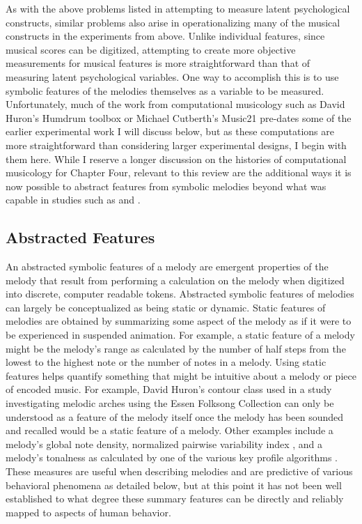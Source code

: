 \documentclass[12pt,]{book}
\begin{document}
As with the above problems listed in attempting to measure latent psychological constructs, similar problems also arise in operationalizing many of the musical constructs in the experiments from above.
Unlike individual features, since musical scores can be digitized, attempting to create more objective measurements for musical features is more straightforward than that of measuring latent psychological variables.
One way to accomplish this is to use symbolic features of the melodies themselves as a variable to be measured.
Unfortunately, much of the work from computational musicology such as David Huron's Humdrum toolbox \citep{huronHumdrumToolkitReference1994} or Michael Cutberth's Music21 \citep{cuthbertMusic21ToolkitComputerAided2010} pre-dates some of the earlier experimental work I will discuss below, but as these computations are more straightforward than considering larger experimental designs, I begin with them here.
While I reserve a longer discussion on the histories of computational musicology for Chapter Four, relevant to this review are the additional ways it is now possible to abstract features from symbolic melodies beyond what was capable in studies such as \citet{ortmannTonalDeterminantsMelodic1933} and \citet{taylorStrategiesMemoryShort1983}.

\hypertarget{abstracted-features}{%
\subsection{Abstracted Features}\label{abstracted-features}}

An abstracted symbolic features of a melody are emergent properties of the melody that result from performing a calculation on the melody when digitized into discrete, computer readable tokens.
Abstracted symbolic features of melodies can largely be conceptualized as being static or dynamic.
Static features of melodies are obtained by summarizing some aspect of the melody as if it were to be experienced in suspended animation.
For example, a static feature of a melody might be the melody's range as calculated by the number of half steps from the lowest to the highest note or the number of notes in a melody.
Using static features helps quantify something that might be intuitive about a melody or piece of encoded music.
For example, David Huron's contour class used in a study investigating melodic arches \citep{huronMelodicArchWestern1996} using the Essen Folksong Collection \citep{schaffrathEssenFolkSong1995} can only be understood as a feature of the melody itself once the melody has been sounded and recalled would be a static feature of a melody.
Other examples include a melody's global note density, normalized pairwise variability index \citep{grabeDurationalVariabilitySpeech2002}, and a melody's tonalness as calculated by one of the various key profile algorithms \citep{krumhanslCognitiveFoundationsMusical2001, albrechtUseLargeCorpora2013}.
These measures are useful when describing melodies and are predictive of various behavioral phenomena as detailed below, but at this point it has not been well established to what degree these summary features can be directly and reliably mapped to aspects of human behavior.
\end{document}

